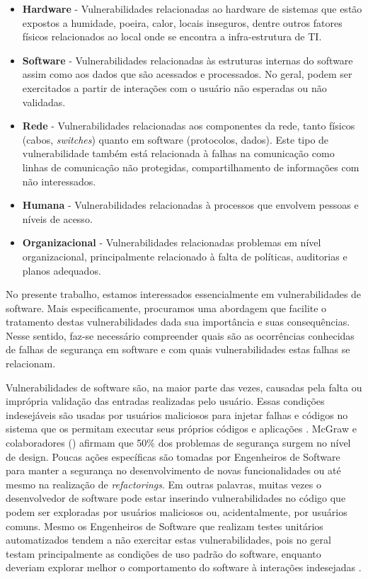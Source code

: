 \begin{itemize}
\item \textbf{Hardware} - Vulnerabilidades relacionadas ao hardware de sistemas que estão expostos a humidade, poeira, calor, locais inseguros, dentre outros fatores físicos relacionados ao local onde se encontra a infra-estrutura de TI.

\item \textbf{Software} - Vulnerabilidades relacionadas às estruturas internas do software assim como aos dados que são acessados e processados. No geral, podem ser exercitados a partir de interações com o usuário não esperadas ou não validadas.

\item \textbf{Rede} - Vulnerabilidades relacionadas aos componentes da rede, tanto físicos (cabos, \emph{switches}) quanto em software (protocolos, dados). Este tipo de vulnerabilidade também está relacionada à falhas na comunicação como linhas de comunicação não protegidas, compartilhamento de informações com não interessados.

\item \textbf{Humana} - Vulnerabilidades relacionadas à processos que envolvem pessoas e níveis de acesso.

\item \textbf{Organizacional} - Vulnerabilidades relacionadas problemas em nível organizacional, principalmente relacionado à falta de políticas, auditorias e planos adequados.
\end{itemize}

%

No presente trabalho, estamos interessados essencialmente em vulnerabilidades de software. Mais especificamente, procuramos uma abordagem que facilite o tratamento destas vulnerabilidades dada sua importância e suas consequências. Nesse sentido, faz-se necessário compreender quais são as ocorrências conhecidas de falhas de segurança em software e com quais vulnerabilidades estas falhas se relacionam.

%

Vulnerabilidades de software são, na maior parte das vezes, causadas pela falta ou imprópria validação das entradas realizadas pelo usuário. Essas condições indesejáveis são usadas por usuários maliciosos para injetar falhas e códigos no sistema que os permitam executar seus próprios códigos e aplicações  \cite{jimenez2009}. McGraw e colaboradores (\citeyear{mcgraw2004}) afirmam que 50\% dos problemas de segurança surgem no nível de design. Poucas ações específicas são tomadas por Engenheiros de Software para manter a segurança no desenvolvimento de novas funcionalidades ou até mesmo na realização de \emph{refactorings}. Em outras palavras, muitas vezes o desenvolvedor de software pode estar inserindo vulnerabilidades no código que podem ser exploradas por usuários maliciosos ou, acidentalmente, por usuários comuns. Mesmo os Engenheiros de Software que realizam testes unitários automatizados tendem a não exercitar estas vulnerabilidades, pois no geral testam principalmente as condições de uso padrão do software, enquanto deveriam explorar melhor o comportamento do software à interações indesejadas \cite{vries2006}.

